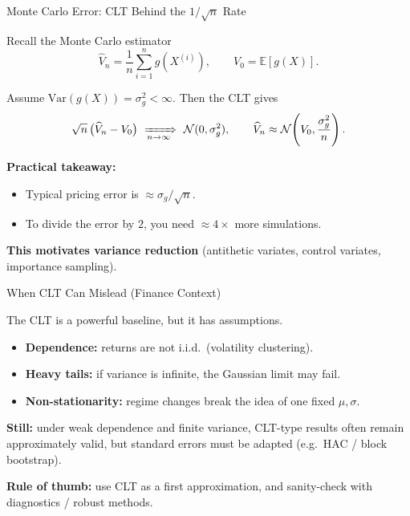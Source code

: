 \documentclass[10pt,aspectratio=169]{beamer}
\begin{document}
\begin{frame}{Monte Carlo Error: CLT Behind the \(1/\sqrt{n}\) Rate}

Recall the Monte Carlo estimator\pause
\[
\widehat{V}_n = \frac{1}{n}\sum_{i=1}^n g(X^{(i)}),
\qquad
V_0=\mathbb{E}[g(X)].
\]\pause

Assume \(\mathrm{Var}(g(X))=\sigma_g^2<\infty\).\pause
Then the CLT gives\pause
\[
\sqrt{n}\,\big(\widehat{V}_n - V_0\big)
\ \xRightarrow[n\to\infty]{}\ 
\mathcal{N}(0,\sigma_g^2),
\qquad
\widehat{V}_n \approx \mathcal{N}\!\left(V_0,\frac{\sigma_g^2}{n}\right).
\]\pause

\medskip
\textbf{Practical takeaway:}\pause
\begin{itemize}
  \item Typical pricing error is \(\approx \sigma_g/\sqrt{n}\).\pause
  \item To divide the error by \(2\), you need \(\approx 4\times\) more simulations.\pause
\end{itemize}

\medskip
\textbf{This motivates variance reduction} (antithetic variates, control variates, importance sampling).
\end{frame}

\begin{frame}{When CLT Can Mislead (Finance Context)}

The CLT is a powerful baseline, but it has assumptions.\pause

\begin{itemize}
  \item \textbf{Dependence:} returns are not i.i.d.\ (volatility clustering).\pause
  \item \textbf{Heavy tails:} if variance is infinite, the Gaussian limit may fail.\pause
  \item \textbf{Non-stationarity:} regime changes break the idea of one fixed \(\mu,\sigma\).\pause
\end{itemize}\pause

\medskip
\textbf{Still:}\pause\;
under weak dependence and finite variance, CLT-type results often remain approximately valid,
but standard errors must be adapted (e.g.\ HAC / block bootstrap).\pause

\medskip
\textbf{Rule of thumb:}\pause\;
use CLT as a first approximation, and sanity-check with diagnostics / robust methods.
\end{frame}
\end{document}
